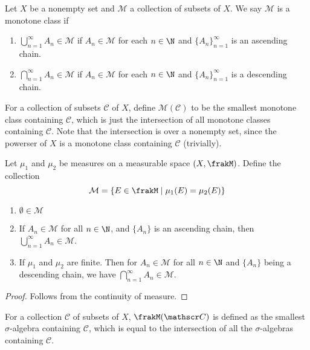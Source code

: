 \begin{definition}
    Let $X$ be a nonempty set and $\mathcal M$ a collection of subsets of $X$. We say $\mathcal M$ is a monotone class if 
    \begin{enumerate}[label=(\alph*)]
        \item $\bigcup\limits_{n = 1}^\infty A_n\in\mathcal M$ if $A_n\in\mathcal M$ for each $n\in\N$ and $\{A_n\}_{n = 1}^\infty$ is an ascending chain.
        \item $\bigcap\limits_{n = 1}^\infty A_n\in\mathcal M$ if $A_n\in\mathcal M$ for each $n\in\N$ and $\{A_n\}_{n = 1}^\infty$ is a descending chain.
    \end{enumerate}
\end{definition}

For a collection of subsets $\mathscr C$ of $X$, define $\mathcal M(\mathscr C)$ to be the smallest monotone class containing $\mathscr C$, which is just the intersection of all monotone classes containing $\mathscr C$. Note that the intersection is over a nonempty set, since the powerser of $X$ is a monotone class containing $\mathscr C$ (trivially).

\begin{proposition}
    Let $\mu_1$ and $\mu_2$ be measures on a measurable space $(X,\frakM)$. Define the collection
    \begin{equation*}
        \mathcal M = \{E\in\frakM\mid\mu_1(E) = \mu_2(E)\}
    \end{equation*}
    \begin{enumerate}[label=(\alph*)]
    \item $\emptyset\in\mathcal M$ 
    \item If $A_n\in\mathcal M$ for all $n\in\N$, and $\{A_n\}$ is an ascending chain, then $\bigcup\limits_{n = 1}^\infty A_n\in\mathcal M$.
    \item If $\mu_1$ and $\mu_2$ are finite. Then for $A_n\in\mathcal M$ for all $n\in\N$ and $\{A_n\}$ being a descending chain, we have $\bigcap\limits_{n = 1}^\infty A_n\in\mathcal M$.
    \end{enumerate}
\end{proposition}
\begin{proof}
    Follows from the continuity of measure.
\end{proof}

\begin{definition}
    For a collection $\mathscr C$ of subsets of $X$, $\frakM(\mathscr C)$ is defined as the smallest $\sigma$-algebra containing $\mathscr C$, which is equal to the intersection of all the $\sigma$-algebras containing $\mathscr C$.
\end{definition}


